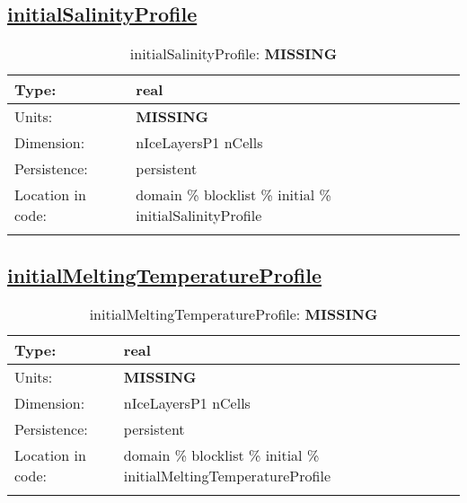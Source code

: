 \subsection[initialSalinityProfile]{\hyperref[sec:var_tab_initial]{initialSalinityProfile}}
\label{subsec:var_sec_initial_initialSalinityProfile}
\begin{center}
\begin{longtable}{| p{2.0in} | p{4.0in} |}
        \hline 
        Type: & real \\
        \hline 
        Units: & {\bf \color{red} MISSING} \\
        \hline 
        Dimension: & nIceLayersP1 nCells \\
        \hline 
        Persistence: & persistent \\
        \hline 
         Location in code: & domain \% blocklist \% initial \% initialSalinityProfile \\
         \hline 
    \caption{initialSalinityProfile: {\bf \color{red} MISSING}}
\end{longtable}
\end{center}
\subsection[initialMeltingTemperatureProfile]{\hyperref[sec:var_tab_initial]{initialMeltingTemperatureProfile}}
\label{subsec:var_sec_initial_initialMeltingTemperatureProfile}
\begin{center}
\begin{longtable}{| p{2.0in} | p{4.0in} |}
        \hline 
        Type: & real \\
        \hline 
        Units: & {\bf \color{red} MISSING} \\
        \hline 
        Dimension: & nIceLayersP1 nCells \\
        \hline 
        Persistence: & persistent \\
        \hline 
         Location in code: & domain \% blocklist \% initial \% initialMeltingTemperatureProfile \\
         \hline 
    \caption{initialMeltingTemperatureProfile: {\bf \color{red} MISSING}}
\end{longtable}
\end{center}
